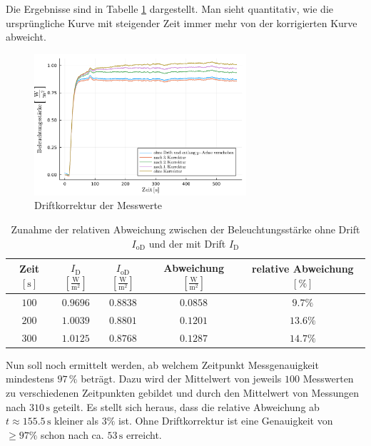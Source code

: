 \documentclass[12pt,a4paper]{scrartcl}
\numberwithin{equation}{section} %
\begin{document}
	Die Ergebnisse sind in Tabelle \ref{tab:rel Abweichung} dargestellt. Man sieht quantitativ, wie die ursprüngliche Kurve mit steigender Zeit immer mehr von der korrigierten Kurve abweicht.
	
	\begin{figure}[h!]
		\centering
		\includegraphics[width=0.7\textwidth]{../media/B1.1/Drift.pdf}
		\caption{Driftkorrektur der Messwerte}
		\label{abb:Driftkorrektur der Messwerte}
	\end{figure}
	
	\begin{table}[h!]
		\centering
		\begin{tabular}{c|c|c|c|c}
			Zeit $[\mathrm{s}]$
			& $I_\mathrm{D}$ $[\mathrm{\frac{W}{m^2}}]$
			& $I_\mathrm{oD}$ $[\mathrm{\frac{W}{m^2}}]$
			& Abweichung $[\mathrm{\frac{W}{m^2}}]$
			& relative Abweichung $[\%]$ \\
			\hline
			$100$ & $0.9696$ & $0.8838$ & $0.0858$ & $9.7\%$\\
			$200$ & $1.0039$ & $0.8801$ & $0.1201$ & $13.6\%$\\
			$300$ & $1.0125$ & $0.8768$ & $0.1287$ & $14.7\%$\\
		\end{tabular}
		\caption{Zunahme der relativen Abweichung zwischen der Beleuchtungsstärke ohne Drift $I_\mathrm{oD}$ und der mit Drift $I_\mathrm{D}$}
		\label{tab:rel Abweichung}
	\end{table}
	
	Nun soll noch ermittelt werden, ab welchem Zeitpunkt Messgenauigkeit mindestens $97\,\%$ beträgt. Dazu wird der Mittelwert von jeweils $100$ Messwerten zu verschiedenen Zeitpunkten gebildet und durch den Mittelwert von Messungen nach $310\mathrm{\,s}$ geteilt. Es stellt sich heraus, dass die relative Abweichung ab $t \approx 155.5\mathrm{\,s}$ kleiner als $3\%$ ist. Ohne Driftkorrektur ist eine Genauigkeit von $\geq 97\%$ schon nach ca. $53\mathrm{\,s}$ erreicht.
	
\end{document}
